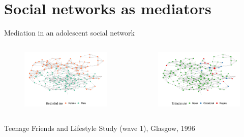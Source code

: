 \documentclass[aspectratio=169]{beamer}
\theoremstyle{remark}
\begin{document}
\section{Social networks as mediators}

\begin{frame}{Mediation in an adolescent social network}

    \begin{columns}


        \begin{figure}[ht]
            \raggedleft
            \includegraphics[width=1.1\textwidth]{figures/glasgow/sex.png}
        \end{figure}


        \begin{figure}[ht]
            \raggedright
            \includegraphics[width=1.1\textwidth]{figures/glasgow/tobacco.png}
        \end{figure}
    \end{columns}

    \centering
    \scriptsize Teenage Friends and Lifestyle Study (wave 1), Glasgow, 1996

\end{frame}
\end{document}
